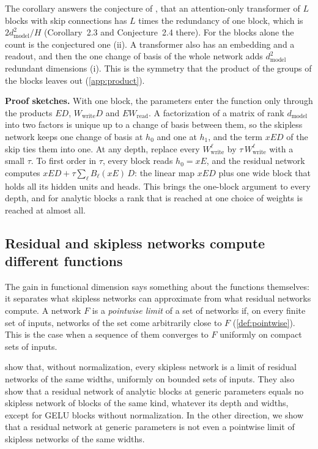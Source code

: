 \documentclass[10pt]{article}
\theoremstyle{definition}
\theoremstyle{remark}
\newcommand{\Wread}{W_{\mathrm{read}}}
\newcommand{\Wwrite}{W_{\mathrm{write}}}
\newcommand{\dm}{d_{\mathrm{model}}}
\newcommand{\para}[1]{\smallskip\noindent\textbf{#1}\hspace{0.5em}}
\begin{document}
The corollary answers the conjecture of \citet{henry2026generic}, that an attention-only transformer of $L$ blocks with skip connections has $L$ times the redundancy of one block, which is $2\dm^2/H$ (Corollary~2.3 and Conjecture~2.4 there). For the blocks alone the count is the conjectured one (ii). A transformer also has an embedding and a readout, and then the one change of basis of the whole network adds $\dm^2$ redundant dimensions (i). This is the symmetry that the product of the groups of the blocks leaves out (\cref{app:product}).

\para{Proof sketches.} With one block, the parameters enter the function only through the products $ED$, $\Wwrite D$ and $E\Wread$. A factorization of a matrix of rank $\dm$ into two factors is unique up to a change of basis between them, so the skipless network keeps one change of basis at $h_0$ and one at $h_1$, and the term $xED$ of the skip ties them into one. At any depth, replace every $\Wwrite^{\ell}$ by $\tau\,\Wwrite^{\ell}$ with a small $\tau$. To first order in $\tau$, every block reads $h_0 = xE$, and the residual network computes $xED + \tau\sum_{\ell} B_\ell(xE)\,D$: the linear map $xED$ plus one wide block that holds all its hidden units and heads. This brings the one-block argument to every depth, and for analytic blocks a rank that is reached at one choice of weights is reached at almost all.

\subsection{Residual and skipless networks compute different functions}\label{sec:classes}

The gain in functional dimension says something about the functions themselves: it separates what skipless networks can approximate from what residual networks compute. A network $F$ is a \emph{pointwise limit} of a set of networks if, on every finite set of inputs, networks of the set come arbitrarily close to $F$ (\cref{def:pointwise}). This is the case when a sequence of them converges to $F$ uniformly on compact sets of inputs.

\citet{mijoski2026worth} show that, without normalization, every skipless network is a limit of residual networks of the same widths, uniformly on bounded sets of inputs. They also show that a residual network of analytic blocks at generic parameters equals no skipless network of blocks of the same kind, whatever its depth and widths, except for GELU blocks without normalization. In the other direction, we show that a residual network at generic parameters is not even a pointwise limit of skipless networks of the same widths.
\end{document}
